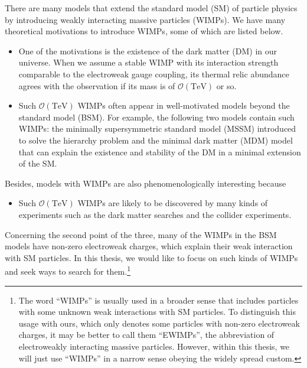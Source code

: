 \documentclass[12pt,twoside,book]{article}
\begin{document}
There are many models that extend the standard model (SM) of particle physics by introducing weakly interacting massive particles (WIMPs).
We have many theoretical motivations to introduce WIMPs, some of which are listed below.
\begin{itemize}
  \item
    One of the motivations is the existence of the dark matter (DM) in our universe.
    When we assume a stable WIMP with its interaction strength comparable to the electroweak gauge coupling, its thermal relic abundance agrees with the observation if its mass is of $\mathcal{O}(\mathrm{TeV})$ or so.
  \item
    Such $\mathcal{O}(\mathrm{TeV})$ WIMPs often appear in well-motivated models beyond the standard model (BSM).
    For example, the following two models contain such WIMPs: the minimally supersymmetric standard model (MSSM) introduced to solve the hierarchy problem and the minimal dark matter (MDM) model that can explain the existence and stability of the DM in a minimal extension of the SM.
\end{itemize}
Besides, models with WIMPs are also phenomenologically interesting because
\begin{itemize}
  \item
    Such $\mathcal{O}(\mathrm{TeV})$ WIMPs are likely to be discovered by many kinds of experiments such as the dark matter searches and the collider experiments.
\end{itemize}
Concerning the second point of the three, many of the WIMPs in the BSM models have non-zero electroweak charges, which explain their weak interaction with SM particles.
In this thesis, we would like to focus on such kinds of WIMPs and seek ways to search for them.\footnote
{
  The word ``WIMPs'' is usually used in a broader sense that includes particles with some unknown weak interactions with SM particles.
  To distinguish this usage with ours, which only denotes some particles with non-zero electroweak charges, it may be better to call them ``EWIMPs'', the abbreviation of electroweakly interacting massive particles.
  However, within this thesis, we will just use ``WIMPs'' in a narrow sense obeying the widely spread custom.
}
\end{document}
